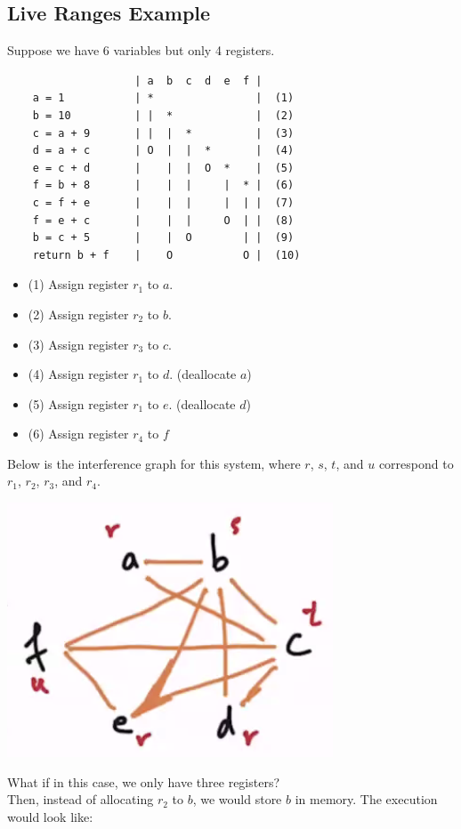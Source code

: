 \documentclass[10pt]{article}
\begin{document}
\subsection*{Live Ranges Example}
Suppose we have 6 variables but only 4 registers.
\begin{verbatim}
                    | a  b  c  d  e  f |
    a = 1           | *                |  (1)
    b = 10          | |  *             |  (2)
    c = a + 9       | |  |  *          |  (3)
    d = a + c       | O  |  |  *       |  (4)
    e = c + d       |    |  |  O  *    |  (5)
    f = b + 8       |    |  |     |  * |  (6)
    c = f + e       |    |  |     |  | |  (7)
    f = e + c       |    |  |     O  | |  (8)
    b = c + 5       |    |  O        | |  (9)
    return b + f    |    O           O |  (10)
\end{verbatim}
\begin{itemize}
    \item (1) Assign register $r_1$ to $a$.
    \item (2) Assign register $r_2$ to $b$.
    \item (3) Assign register $r_3$ to $c$.
    \item (4) Assign register $r_1$ to $d$. (deallocate $a$)
    \item (5) Assign register $r_1$ to $e$. (deallocate $d$)
    \item (6) Assign register $r_4$ to $f$
\end{itemize}
Below is the interference graph for this system, where $r$, $s$, $t$, and $u$ correspond to $r_1$, $r_2$, $r_3$, and $r_4$.
\begin{center}
    \includegraphics*[scale=0.7]{W6_1.png}
\end{center}
What if in this case, we only have three registers?\\
Then, instead of allocating $r_2$ to $b$, we would store $b$ in memory.  The execution would look like:
\end{document}
